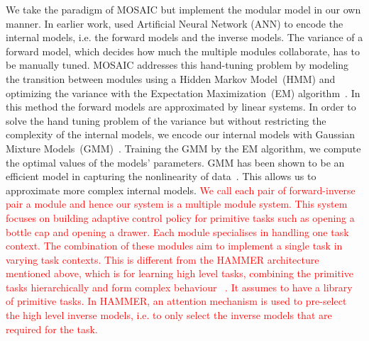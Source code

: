 We take the paradigm of MOSAIC but implement the modular model in our own manner. In earlier work, \citet{wolpert1998multiple} used
Artificial Neural Network (ANN) to encode the internal models,
i.e. the forward models and the inverse models. The variance of a
forward model, which decides how much the multiple modules
collaborate, has to be manually tuned. MOSAIC addresses this
hand-tuning problem by modeling the transition between modules using a Hidden Markov Model~(HMM) and optimizing the variance with the
Expectation Maximization~(EM) algorithm~\citep{haruno2001mosaic}. In
this method the forward models are approximated by linear systems. In order to solve the hand tuning problem of the variance but without restricting the complexity of the internal models, we encode our internal models with
Gaussian Mixture Models~(GMM)~\citep{cohn1996active}. Training the
GMM by the EM algorithm, we compute the optimal values of the models'
parameters. GMM has been shown to be an efficient model in capturing
the nonlinearity of
data~\citep{calinon2007incremental,sauser2011iterative,huang2013learning}.
This allows us to approximate more complex internal models.
\textcolor{red}{We call each pair of forward-inverse pair a module and hence our system is a multiple module system. This system focuses on building adaptive control policy for primitive tasks such as opening a bottle cap and opening a drawer. Each module specialises in handling one task context. The combination of these modules aim to implement a single task in varying task contexts. This is different from the HAMMER architecture mentioned above, which is for learning high level tasks, combining the primitive tasks hierarchically and form complex behaviour   ~\citep{johnson2005hierarchies}. It assumes to have a library of primitive tasks. In HAMMER, an attention mechanism is used to pre-select the high level inverse models, i.e. to only select the inverse models that are required for the task.  }



